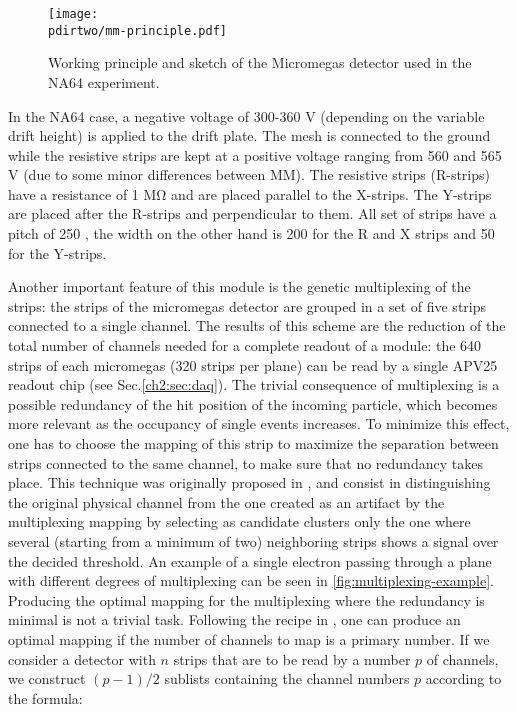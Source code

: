 \begin{figure}[bth!]
  \centering
  \texttt{[image: \\pdirtwo/mm-principle.pdf]}
\caption[Micromegas sketch]{Working principle and sketch of the Micromegas detector used in the NA64 experiment.}
\label{fig:mm-sketch}
\end{figure}

In the NA64 case, a negative voltage of 300-360 \si{\volt} (depending on the variable drift height) is applied to the drift plate. The mesh is connected to the ground while the resistive strips are kept at a positive voltage ranging from 560 and 565 \si{\volt} (due to some minor differences between MM). The resistive strips (R-strips) have a resistance of 1 \si{\mega\ohm} and are placed parallel to the X-strips. The Y-strips are placed after the R-strips and perpendicular to them. All set of strips have a pitch of 250 \mum, the width on the other hand is 200 \mum for the R and X strips and 50 \mum for the Y-strips.

Another important feature of this module is the genetic multiplexing of the strips: the strips of the micromegas detector are grouped in a set of five strips connected to a single channel. The results of this scheme are the reduction of the total number of channels needed for a complete readout of a module: the 640 strips of each micromegas (320 strips per plane) can be read by a single APV25 readout chip (see Sec.\ref{ch2:sec:daq}). The trivial consequence of multiplexing is a possible redundancy of the hit position of the incoming particle, which becomes more relevant as the occupancy of single events increases. To minimize this effect, one has to choose the mapping of this strip to maximize the separation between strips connected to the same channel, to make sure that no redundancy takes place. This technique was originally proposed in \cite{Procureur:2013yea}, and consist in distinguishing the original physical channel from the one created as an artifact by the multiplexing mapping by selecting as candidate clusters only the one where several (starting from a minimum of two) neighboring strips shows a signal over the decided threshold. An example of a single electron passing through a plane with different degrees of multiplexing can be seen in \ref{fig:multiplexing-example}. Producing the optimal mapping for the multiplexing where the redundancy is minimal is not a trivial task. Following the recipe in \cite{Procureur:2013yea}, one can produce an optimal mapping if the number of channels to map is a primary number. If we consider a detector with $n$ strips that are to be read by a number $p$ of channels, we construct $(p-1)/2$ sublists containing the channel numbers $p$ according to the formula:

